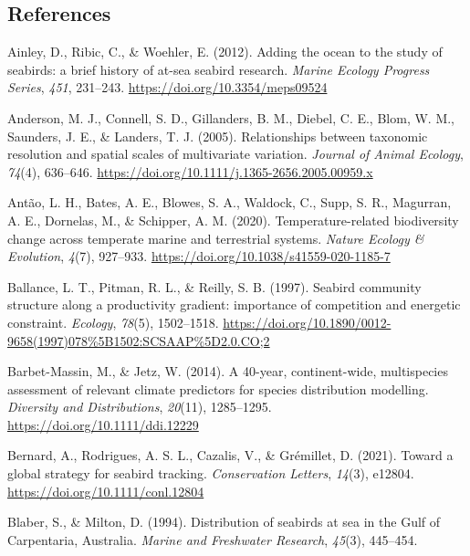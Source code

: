 \documentclass{article}
\newlength{\cslhangindent}
\newlength{\cslentryspacingunit} %
\newenvironment{CSLReferences}[2] %
 {%
  \setlength{\parindent}{0pt}
  \ifodd #1
  \let\oldpar\par
  \def\par{\hangindent=\cslhangindent\oldpar}
  \fi
  \setlength{\parskip}{#2\cslentryspacingunit}
 }%
 {}
\begin{document}
\begin{linenumbers}
\hypertarget{references}{%
\section{References}\label{references}}

\hypertarget{refs}{}
\begin{CSLReferences}{1}{0}
\leavevmode{}%
Ainley, D., Ribic, C., \& Woehler, E. (2012). Adding the ocean to the study of seabirds: a brief history of at-sea seabird research. \emph{Marine Ecology Progress Series}, \emph{451}, 231--243. \url{https://doi.org/10.3354/meps09524}

\leavevmode{}%
Anderson, M. J., Connell, S. D., Gillanders, B. M., Diebel, C. E., Blom, W. M., Saunders, J. E., \& Landers, T. J. (2005). Relationships between taxonomic resolution and spatial scales of multivariate variation. \emph{Journal of Animal Ecology}, \emph{74}(4), 636--646. \url{https://doi.org/10.1111/j.1365-2656.2005.00959.x}

\leavevmode{}%
Antão, L. H., Bates, A. E., Blowes, S. A., Waldock, C., Supp, S. R., Magurran, A. E., Dornelas, M., \& Schipper, A. M. (2020). Temperature-related biodiversity change across temperate marine and terrestrial systems. \emph{Nature Ecology \& Evolution}, \emph{4}(7), 927--933. \url{https://doi.org/10.1038/s41559-020-1185-7}

\leavevmode{}%
Ballance, L. T., Pitman, R. L., \& Reilly, S. B. (1997). Seabird community structure along a productivity gradient: importance of competition and energetic constraint. \emph{Ecology}, \emph{78}(5), 1502--1518. \url{https://doi.org/10.1890/0012-9658(1997)078\%5B1502:SCSAAP\%5D2.0.CO;2}

\leavevmode{}%
Barbet-Massin, M., \& Jetz, W. (2014). A 40-year, continent-wide, multispecies assessment of relevant climate predictors for species distribution modelling. \emph{Diversity and Distributions}, \emph{20}(11), 1285--1295. \url{https://doi.org/10.1111/ddi.12229}

\leavevmode{}%
Bernard, A., Rodrigues, A. S. L., Cazalis, V., \& Grémillet, D. (2021). Toward a global strategy for seabird tracking. \emph{Conservation Letters}, \emph{14}(3), e12804. \url{https://doi.org/10.1111/conl.12804}

\leavevmode{}%
Blaber, S., \& Milton, D. (1994). Distribution of seabirds at sea in the {G}ulf of {C}arpentaria, {A}ustralia. \emph{Marine and Freshwater Research}, \emph{45}(3), 445--454.


\end{CSLReferences}
\end{linenumbers}
\end{document}

